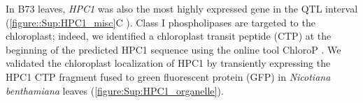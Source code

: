 \documentclass[9pt,twocolumn,twoside,lineno]{biorxiv}
\newcommand{\hpc}{\textit{HPC1}\xspace}
\begin{document}
In B73 leaves, \hpc was also the most highly expressed gene in the QTL interval (\cref{figure::Sup:HPC1_misc}C \cite{Stelpflug2016-vr}).
Class I phospholipases are targeted to the chloroplast; indeed, we identified a chloroplast transit peptide (CTP) at the beginning of the predicted HPC1 sequence using the online tool ChloroP \cite{Emanuelsson1999-rs}.
We validated the chloroplast localization of HPC1 by transiently expressing  the HPC1 CTP fragment fused to green fluorescent protein (GFP) in \textit{Nicotiana benthamiana} leaves (\cref{figure:Sup:HPC1_organelle}).
\end{document}
